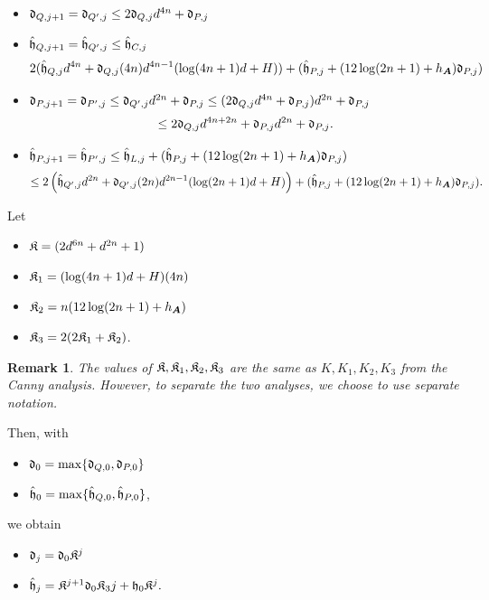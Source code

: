 \documentclass[12pt]{article}
\def\mA{{\bm A}}
\def\fd{\frak{d}}
\def\fh{\frak{h}}
\def\fhh{\hat{\frak{h}}}
\def\fK{\frak{K}}
\newtheorem{remark}[theorem]{Remark}
\def\mA{{\bm A}}
\begin{document}
\begin{itemize}
\begin{itemize} %
    \item $\fd_{Q,j+1} = \fd_{Q',j}\leq 2\fd_{Q,j}d^{4n} + \fd_{P,j}$
    \item $\hat{\fh}_{Q,j+1} = \hat{\fh}_{Q',j}\leq \hat{\fh}_{C,j}$
    \[
    2(\hat{\fh}_{Q,j}d^{4n} + \fd_{Q,j} (4n)d^{4n-1}(\log(4n+1)d + H)) + (\hat{\fh}_{P,j}+(12\log(2n+1)+h_{\mA})\fd_{P,j})
    \]
    \item $\fd_{P,j+1} = \fd_{P',j} \leq \fd_{Q',j}d^{2n}+\fd_{P,j}\leq (2\fd_{Q,j}d^{4n} + \fd_{P,j})d^{2n}+\fd_{P,j}$
    \[
    \leq 2\fd_{Q,j}d^{4n+2n}+\fd_{P,j}d^{2n}+\fd_{P,j}.
    \]
    \item $\hat{\fh}_{P,j+1} = \hat{\fh}_{P',j}\leq \hat{\fh}_{L,j}+(\hat{\fh}_{P,j}+(12\log(2n+1)+h_{\mA})\fd_{P,j})$
    \[
    \leq 2\left(\hat{\fh}_{Q',j}d^{2n} + \fd_{Q',j} (2n)d^{2n-1}(\log(2n+1)d + H)\right)
    +(\hat{\fh}_{P,j}+(12\log(2n+1)+h_{\mA})\fd_{P,j}).  
    \]
\end{itemize}

Let 
%
\begin{itemize}
    \item $\fK = (2d^{6n}+d^{2n}+1)$
    \item $\fK_1 = (\log(4n+1)d+H)(4n)$
    \item $\fK_2 = n(12\log(2n+1)+h_{\mA})$
    \item $\fK_3 = 2(2\fK_1+\fK_2)$.
\end{itemize}
\begin{remark}
    The values of $\fK,\fK_1,\fK_2,\fK_3$ are the same as $K,K_1,K_2,K_3$ from the Canny analysis. However, to separate the two analyses, we choose to use separate notation. 
\end{remark}
Then, with
\begin{itemize}
    \item $\fd_0 = \max\{\fd_{Q,0},\fd_{P,0}\}$
    \item $\fhh_0 = \max\{\fhh_{Q,0},\fhh_{P,0}\}$,
\end{itemize}

we obtain
\begin{itemize}
    \item $\fd_j = \fd_0\fK^j$
    \item $\hat{\fh}_j = \fK^{j+1}\fd_0\fK_3j+\fh_0\fK^j.$
\end{itemize}

  






















\end{itemize}
\end{document}
